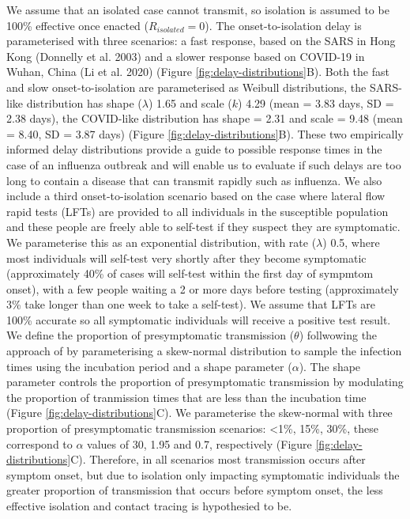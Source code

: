 \documentclass{article}
\begin{document}
We assume that an isolated case cannot transmit, so isolation is assumed to be 100\% effective once enacted ($R_{isolated} = 0$). The onset-to-isolation delay is parameterised with three scenarios: a fast response, based on the SARS in Hong Kong (Donnelly et al. 2003) and a slower response based on COVID-19 in Wuhan, China (Li et al. 2020) (Figure \ref{fig:delay-distributions}B). Both the fast and slow onset-to-isolation are parameterised as Weibull distributions, the SARS-like distribution has shape ($\lambda$) 1.65 and scale ($k$) 4.29 (mean = 3.83 days, SD = 2.38 days), the COVID-like distribution has shape = 2.31 and scale = 9.48 (mean = 8.40, SD = 3.87 days) (Figure \ref{fig:delay-distributions}B). These two empirically informed delay distributions provide a guide to possible response times in the case of an influenza outbreak and will enable us to evaluate if such delays are too long to contain a disease that can transmit rapidly such as influenza. We also include a third onset-to-isolation scenario based on the case where lateral flow rapid tests (LFTs) are provided to all individuals in the susceptible population and these people are freely able to self-test if they suspect they are symptomatic. We parameterise this as an exponential distribution, with rate ($\lambda$) 0.5, where most individuals will self-test very shortly after they become symptomatic (approximately 40\% of cases will self-test within the first day of sympmtom onset), with a few people waiting a 2 or more days before testing (approximately 3\% take longer than one week to take a self-test). We assume that LFTs are 100\% accurate so all symptomatic individuals will receive a positive test result. \\

We define the proportion of presymptomatic transmission ($\theta$) follwowing the approach of \cite{hellewellFeasibilityControllingCOVID192020} by parameterising a skew-normal distribution to sample the infection times using the incubation period and a shape parameter ($\alpha$). The shape parameter controls the proportion of presymptomatic transmission by modulating the proportion of tranmission times that are less than the incubation time (Figure \ref{fig:delay-distributions}C). We parameterise the skew-normal with three proportion of presymptomatic transmission scenarios: <1\%, 15\%, 30\%, these correspond to $\alpha$ values of 30, 1.95 and 0.7, respectively (Figure \ref{fig:delay-distributions}C). Therefore, in all scenarios most transmission occurs after symptom onset, but due to isolation only impacting symptomatic individuals the greater proportion of transmission that occurs before symptom onset, the less effective isolation and contact tracing is hypothesied to be. \\
\end{document}
